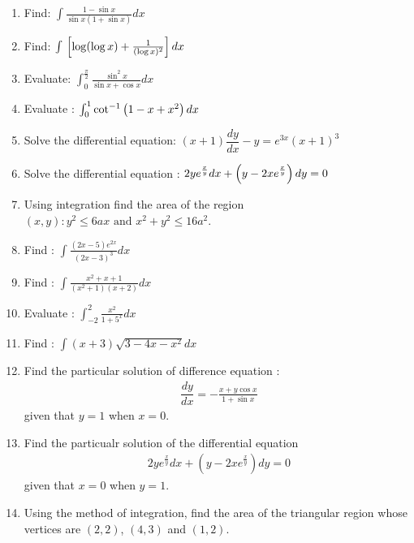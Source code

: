 \begin{enumerate}
	\item Find: $\int \frac{1- \sin x}{\sin x (1 + \sin x)} dx$

	\item Find: $\int {}\left[\log (\log x)+ \frac{1}{(\log x)^2}\right] dx$

	\item Evaluate: $\int_0^\frac{\pi}{2} \frac{\sin^2x}{\sin x + \cos x} dx$

	\item Evaluate : $ \int_0^1 \cot^{-1}\left(1 - x + x^2\right) dx$

	\item Solve the differential equation: $(x + 1) \dfrac{dy}{dx} - y = e^{3x} (x + 1)^3$ 

	\item Solve the differential equation : $2y e^{\frac{x}{y}}dx + \left(y - 2x e^{\frac{x}{y}}\right)dy = 0$

	\item Using integration find the area of the region ${(x, y) : y^2 \leq 6ax \text{ and }
 x^2+y^2 \leq 16a^2}$.



	\item Find : $\int \frac{(2x-5)e^{2x}}{(2x-3)^3} dx$

	\item Find : $\int \frac{x^2 +x +1}{(x^2 + 1)(x + 2)} dx$

	\item Evaluate : $\int_{-2}^{2} \frac{x^2}{1+5^x} dx$

	\item Find : $\int (x+3)\sqrt{3 - 4x - x^2} dx$\\

	\item Find the particular solution of difference equation :\\
	\begin{align}
 		\dfrac{dy}{dx} = - \frac{x + y\cos x}{1 + \sin x}
 	\end{align}
 given that $y = 1$ when $x = 0$.

	\item Find the particualr solution of the differential equation
	\begin{align*}
		2y e^{\frac{x}{y}} dx + (y -2x e^{\frac{x}{y}}) dy = 0
	\end{align*}
given that $x = 0$ when $y = 1$.

	\item Using the method of integration, find the area of the triangular region whose vertices are $(2, 2)$, $(4, 3)$ and $(1, 2)$.

\end{enumerate}
